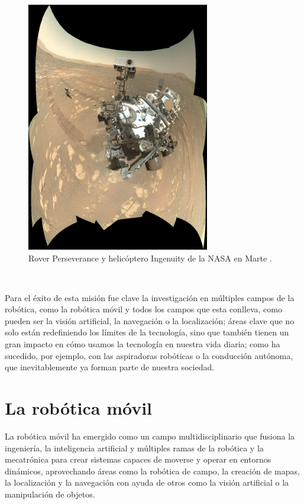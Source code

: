 \begin{figure} [h!]
  \begin{center}
    \includegraphics[width=8cm]{figs/perseverance_ingenuity_selfie_panorama}
  \end{center}
  \caption{Rover Perseverance y helicóptero Ingenuity de la NASA en Marte \citep{perseverance_ingenuity}.}
  \label{fig:rover}
\end{figure}\

Para el éxito de esta misión fue clave la investigación en múltiples campos de
la robótica, como la robótica móvil y todos los campos que esta conlleva, como
pueden ser la visión artificial, la navegación o la localización; áreas clave
que no solo están redefiniendo los límites de la tecnología, sino que también
tienen un gran impacto en cómo usamos la tecnología en nuestra vida diaria; como
ha sucedido, por ejemplo, con las aspiradoras robóticas o la conducción
autónoma, que inevitablemente ya forman parte de nuestra sociedad.



\section{La robótica móvil}
\label{sec:robotica_movil} %

La robótica móvil ha emergido como un campo multidisciplinario que fusiona la
ingeniería, la inteligencia artificial y múltiples ramas de la robótica y la
mecatrónica para crear sistemas capaces de moverse y operar en entornos
dinámicos, aprovechando áreas como la robótica de campo, la creación de mapas,
la localización y la navegación con ayuda de otros como la visión artificial o
la manipulación de objetos.
\\

